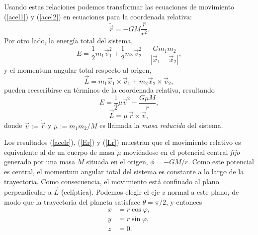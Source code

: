 Usando estas relaciones podemos transformar las ecuaciones de movimiento (\ref{acel1}) y (\ref{acel2}) en ecuaciones para la coordenada relativa:
\begin{equation}
\ddot{\vec{r}}=-GM\frac{\hat{r}}{r^2} .\label{acelr}
\end{equation}
Por otro lado, la energía total del sistema,
\begin{equation}
E=\frac{1}{2}m_1\vec{v}_1^2+\frac{1}{2}m_2\vec{v}_2^2-\frac{Gm_1m_2}{|\vec{x}_1-\vec{x}_2|},
\end{equation}
y el momentum angular total respecto al origen,
\begin{equation}
\vec{L}=m_1\vec{x}_1\times\vec{v}_1+m_2\vec{x}_2\times\vec{v}_2,
\end{equation}
pueden reescribirse en términos de la coordenada relativa, resultando
\begin{equation}\label{Er}
E=\frac{1}{2}\mu \vec{v}^2-\frac{G\mu M}{r},
\end{equation}
\begin{equation}\label{Lr}
\vec{L}=\mu\,\vec{r}\times\vec{v},
\end{equation}
donde $\vec{v}:=\dot{\vec{r}}$ y $\mu:=m_1m_2/M$ es llamada la \textit{masa reducida} del sistema.

Los resultados (\ref{acelr}), (\ref{Er}) y (\ref{Lr}) muestran que el movimiento relativo es equivalente al de un cuerpo de masa $\mu$ moviéndose en el potencial central \textit{fijo} generado por una masa $M$ situada en el origen, $\phi=-GM/r$. Como este potencial es central, el momentum angular total del sistema es constante a lo largo de la trayectoria. Como consecuencia, el movimiento está confinado al plano perpendicular a $\vec{L}$ (eclíptica). Podemos elegir el eje $z$ normal a este plano, de modo que la trayectoria del planeta satisface $\theta=\pi/2$, y entonces
\begin{align}
x & = r\cos\varphi ,\\
y & = r\sin\varphi ,\\
z & = 0.
\end{align}


